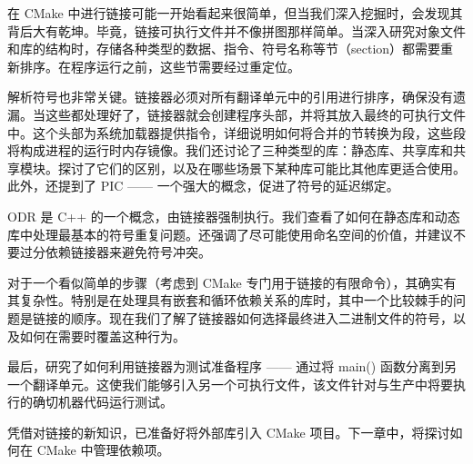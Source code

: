 在 CMake 中进行链接可能一开始看起来很简单，但当我们深入挖掘时，会发现其背后大有乾坤。毕竟，链接可执行文件并不像拼图那样简单。当深入研究对象文件和库的结构时，存储各种类型的数据、指令、符号名称等节（section）都需要重新排序。在程序运行之前，这些节需要经过重定位。

解析符号也非常关键。链接器必须对所有翻译单元中的引用进行排序，确保没有遗漏。当这些都处理好了，链接器就会创建程序头部，并将其放入最终的可执行文件中。这个头部为系统加载器提供指令，详细说明如何将合并的节转换为段，这些段将构成进程的运行时内存镜像。我们还讨论了三种类型的库：静态库、共享库和共享模块。探讨了它们的区别，以及在哪些场景下某种库可能比其他库更适合使用。此外，还提到了 PIC —— 一个强大的概念，促进了符号的延迟绑定。

ODR 是 C++ 的一个概念，由链接器强制执行。我们查看了如何在静态库和动态库中处理最基本的符号重复问题。还强调了尽可能使用命名空间的价值，并建议不要过分依赖链接器来避免符号冲突。

对于一个看似简单的步骤（考虑到 CMake 专门用于链接的有限命令），其确实有其复杂性。特别是在处理具有嵌套和循环依赖关系的库时，其中一个比较棘手的问题是链接的顺序。现在我们了解了链接器如何选择最终进入二进制文件的符号，以及如何在需要时覆盖这种行为。

最后，研究了如何利用链接器为测试准备程序 —— 通过将 main() 函数分离到另一个翻译单元。这使我们能够引入另一个可执行文件，该文件针对与生产中将要执行的确切机器代码运行测试。

凭借对链接的新知识，已准备好将外部库引入 CMake 项目。下一章中，将探讨如何在 CMake 中管理依赖项。